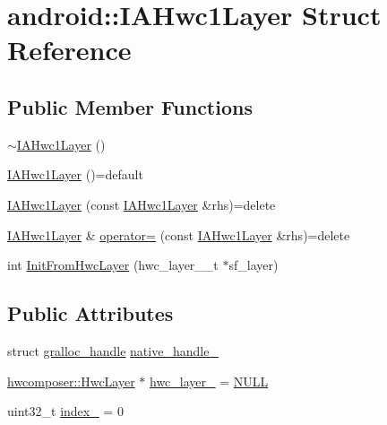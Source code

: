 \hypertarget{structandroid_1_1IAHwc1Layer}{}\section{android\+:\+:I\+A\+Hwc1Layer Struct Reference}
\label{structandroid_1_1IAHwc1Layer}
\subsection*{Public Member Functions}
\begin{DoxyCompactItemize}
\item 
\mbox{\hyperlink{structandroid_1_1IAHwc1Layer_adbcac701e32e99206ceb911be824939b}{$\sim$\+I\+A\+Hwc1\+Layer}} ()
\item 
\mbox{\hyperlink{structandroid_1_1IAHwc1Layer_ae51948343602ce0238d90b88d5eb2006}{I\+A\+Hwc1\+Layer}} ()=default
\item 
\mbox{\hyperlink{structandroid_1_1IAHwc1Layer_a43a8e6a94f32bad32521134468b70ea0}{I\+A\+Hwc1\+Layer}} (const \mbox{\hyperlink{structandroid_1_1IAHwc1Layer}{I\+A\+Hwc1\+Layer}} \&rhs)=delete
\item 
\mbox{\hyperlink{structandroid_1_1IAHwc1Layer}{I\+A\+Hwc1\+Layer}} \& \mbox{\hyperlink{structandroid_1_1IAHwc1Layer_ad88da4784772f560e2c8e84c4e179099}{operator=}} (const \mbox{\hyperlink{structandroid_1_1IAHwc1Layer}{I\+A\+Hwc1\+Layer}} \&rhs)=delete
\item 
int \mbox{\hyperlink{structandroid_1_1IAHwc1Layer_a0a89271f00ea9f41b4d6c538c88e4db3}{Init\+From\+Hwc\+Layer}} (hwc\+\_\+layer\+\_\+\_\+t $\ast$sf\+\_\+layer)
\end{DoxyCompactItemize}
\subsection*{Public Attributes}
\begin{DoxyCompactItemize}
\item 
struct \mbox{\hyperlink{structgralloc__handle}{gralloc\+\_\+handle}} \mbox{\hyperlink{structandroid_1_1IAHwc1Layer_a81d694f9efc870a94da031fe93cedc2c}{native\+\_\+handle\+\_\+}}
\item 
\mbox{\hyperlink{structhwcomposer_1_1HwcLayer}{hwcomposer\+::\+Hwc\+Layer}} $\ast$ \mbox{\hyperlink{structandroid_1_1IAHwc1Layer_a98d5f605974a027cf3fda34ede0860fb}{hwc\+\_\+layer\+\_\+}} = \mbox{\hyperlink{alios_2platformdefines_8h_a070d2ce7b6bb7e5c05602aa8c308d0c4}{N\+U\+LL}}
\item 
uint32\+\_\+t \mbox{\hyperlink{structandroid_1_1IAHwc1Layer_a3cc6f201467654efe8814e2264f927e1}{index\+\_\+}} = 0
\end{DoxyCompactItemize}


